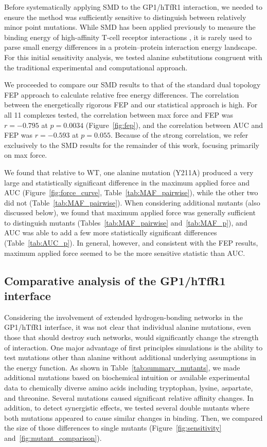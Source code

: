 \documentclass[12pt]{article}
\begin{document}
Before systematically applying SMD to the GP1/hTfR1 interaction, we needed to ensure the method was sufficiently sensitive to distinguish between relatively minor point mutations. While SMD has been applied previously to measure the binding energy of high-affinity T-cell receptor interactions \citep{Cuendet2008,Cuendet2011}, it is rarely used to parse small energy differences in a protein--protein interaction energy landscape. For this initial sensitivity analysis, we tested alanine substitutions congruent with the traditional experimental and computational approach. 

We proceeded to compare our SMD results to that of the standard dual topology FEP approach to calculate relative free energy differences. The correlation between the energetically rigorous FEP and our statistical approach is high. For all 11 complexes tested, the correlation between max force and FEP was $r=-0.795$ at $p=0.0034$ (Figure~\ref{fig:fep}), and the correlation between AUC and FEP was $r=-0.593$ at $p=0.055$. Because of the strong correlation, we refer exclusively to the SMD results for the remainder of this work, focusing primarily on max force.

We found that relative to WT, one alanine mutation (Y211A) produced a very large and statistically significant difference in the maximum applied force and AUC (Figure~\ref{fig:force_curve}, Table~\ref{tab:MAF_pairwise}), while the other two did not (Table~\ref{tab:MAF_pairwise}). When considering additional mutants (also discussed below), we found that maximum applied force was generally sufficient to distinguish mutants (Tables~\ref{tab:MAF_pairwise} and~\ref{tab:MAF_p}), and AUC was able to add a few more statistically significant differences (Table~\ref{tab:AUC_p}). In general, however, and consistent with the FEP results, maximum applied force seemed to be the more sensitive statistic than AUC.

\subsection{Comparative analysis of the GP1/hTfR1 interface}
Considering the involvement of extended hydrogen-bonding networks in the GP1/hTfR1 interface, it was not clear that individual alanine mutations, even those that should destroy such networks, would significantly change the strength of interaction. One major advantage of first principles simulations is the ability to test mutations other than alanine without additional underlying assumptions in the energy function. As shown in Table~\ref{tab:summary_mutants}, we made additional mutations based on biochemical intuition or available experimental data to chemically diverse amino acids including tryptophan, lysine, aspartate, and threonine. Several mutations caused significant relative affinity changes. In addition, to detect synergistic effects, we tested several double mutants where both mutations appeared to cause similar changes in binding. Then, we compared the size of those differences to single mutants (Figure~\ref{fig:sensitivity} and~\ref{fig:mutant_comparison}).
\end{document}
